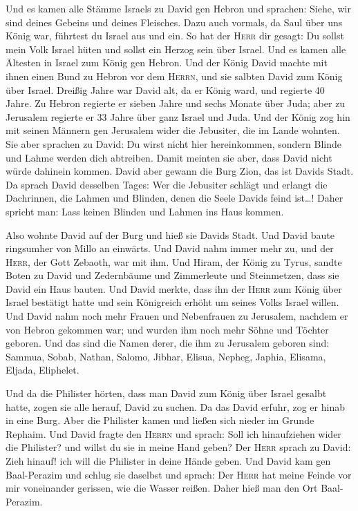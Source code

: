  Und es kamen alle Stämme Israels zu David gen Hebron und
sprachen: Siehe, wir sind deines Gebeins und deines Fleisches.
 Dazu auch vormals, da Saul über uns König war, führtest
du Israel aus und ein. So hat der \textsc{Herr} dir gesagt: Du sollst
mein Volk Israel hüten und sollst ein Herzog sein über Israel.
 Und es kamen alle Ältesten in Israel zum König gen
Hebron. Und der König David machte mit ihnen einen Bund zu Hebron vor
dem \textsc{Herrn}, und sie salbten David zum König über Israel.
 Dreißig Jahre war David alt, da er König ward, und
regierte 40 Jahre.  Zu Hebron regierte er sieben Jahre und
sechs Monate über Juda; aber zu Jerusalem regierte er 33 Jahre über ganz
Israel und Juda.  Und der König zog hin mit seinen Männern
gen Jerusalem wider die Jebusiter, die im Lande wohnten. Sie aber
sprachen zu David: Du wirst nicht hier hereinkommen, sondern Blinde und
Lahme werden dich abtreiben. Damit meinten sie aber, dass David nicht
würde dahinein kommen.  David aber gewann die Burg Zion,
das ist Davids Stadt.  Da sprach David desselben Tages:
Wer die Jebusiter schlägt und erlangt die Dachrinnen, die Lahmen und
Blinden, denen die Seele Davids feind ist\ldots! Daher spricht man: Lass
keinen Blinden und Lahmen ins Haus kommen.

 Also wohnte David auf der Burg und hieß sie Davids Stadt.
Und David baute ringsumher von Millo an einwärts.  Und
David nahm immer mehr zu, und der \textsc{Herr}, der Gott Zebaoth, war
mit ihm.  Und Hiram, der König zu Tyrus, sandte Boten zu
David und Zedernbäume und Zimmerleute und Steinmetzen, dass sie David
ein Haus bauten.  Und David merkte, dass ihn der
\textsc{Herr} zum König über Israel bestätigt hatte und sein Königreich
erhöht um seines Volks Israel willen.  Und David nahm
noch mehr Frauen und Nebenfrauen zu Jerusalem, nachdem er von Hebron
gekommen war; und wurden ihm noch mehr Söhne und Töchter geboren.
 Und das sind die Namen derer, die ihm zu Jerusalem
geboren sind: Sammua, Sobab, Nathan, Salomo,  Jibhar,
Elisua, Nepheg, Japhia,  Elisama, Eljada, Eliphelet.

 Und da die Philister hörten, dass man David zum König
über Israel gesalbt hatte, zogen sie alle herauf, David zu suchen. Da
das David erfuhr, zog er hinab in eine Burg.  Aber die
Philister kamen und ließen sich nieder im Grunde Rephaim.
 Und David fragte den \textsc{Herrn} und sprach: Soll ich
hinaufziehen wider die Philister? und willst du sie in meine Hand geben?
Der \textsc{Herr} sprach zu David: Zieh hinauf! ich will die Philister
in deine Hände geben.  Und David kam gen Baal-Perazim und
schlug sie daselbst und sprach: Der \textsc{Herr} hat meine Feinde vor
mir voneinander gerissen, wie die Wasser reißen. Daher hieß man den Ort
Baal-Perazim.

